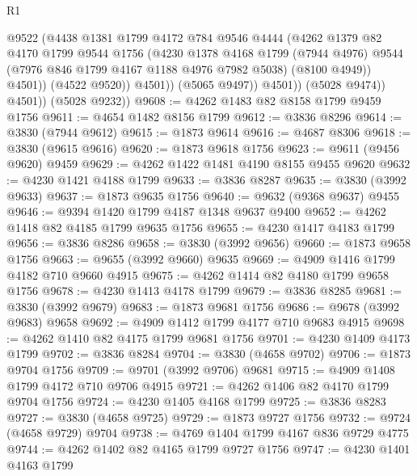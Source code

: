 \begin{lexlean}{R1}
\begin{coremodule}
                        @9522
                        (@4438
                          @1381
                          @1799
                          @4172
                          @784
                          @9546
                          @4444
                          (@4262
                            @1379
                            @82
                            @4170
                            @1799
                            @9544
                            @1756
                            (@4230
                              @1378
                              @4168
                              @1799
                              (@7944 @4976)
                              @9544
                              (@7976 @846 @1799 @4167 @1188 @4976 @7982 @5038)
                              (@8100 @4949))
                            @4501))
                        (@4522 @9520))
                      @4501))
                  (@5065 @9497))
                @4501))
            (@5028 @9474))
          @4501))
      (@5028 @9232))
@9608 := @4262 @1483 @82 @8158 @1799 @9459 @1756
@9611 := @4654 @1482 @8156 @1799
@9612 := @3836 @8296
@9614 := @3830 (@7944 @9612)
@9615 := @1873 @9614
@9616 := @4687 @8306
@9618 := @3830 (@9615 @9616)
@9620 := @1873 @9618 @1756
@9623 := @9611 (@9456 @9620) @9459
@9629 := @4262 @1422 @1481 @4190 @8155 @9455 @9620
@9632 := @4230 @1421 @4188 @1799
@9633 := @3836 @8287
@9635 := @3830 (@3992 @9633)
@9637 := @1873 @9635 @1756
@9640 := @9632 (@9368 @9637) @9455
@9646 := @9394 @1420 @1799 @4187 @1348 @9637 @9400
@9652 := @4262 @1418 @82 @4185 @1799 @9635 @1756
@9655 := @4230 @1417 @4183 @1799
@9656 := @3836 @8286
@9658 := @3830 (@3992 @9656)
@9660 := @1873 @9658 @1756
@9663 := @9655 (@3992 @9660) @9635
@9669 := @4909 @1416 @1799 @4182 @710 @9660 @4915
@9675 := @4262 @1414 @82 @4180 @1799 @9658 @1756
@9678 := @4230 @1413 @4178 @1799
@9679 := @3836 @8285
@9681 := @3830 (@3992 @9679)
@9683 := @1873 @9681 @1756
@9686 := @9678 (@3992 @9683) @9658
@9692 := @4909 @1412 @1799 @4177 @710 @9683 @4915
@9698 := @4262 @1410 @82 @4175 @1799 @9681 @1756
@9701 := @4230 @1409 @4173 @1799
@9702 := @3836 @8284
@9704 := @3830 (@4658 @9702)
@9706 := @1873 @9704 @1756
@9709 := @9701 (@3992 @9706) @9681
@9715 := @4909 @1408 @1799 @4172 @710 @9706 @4915
@9721 := @4262 @1406 @82 @4170 @1799 @9704 @1756
@9724 := @4230 @1405 @4168 @1799
@9725 := @3836 @8283
@9727 := @3830 (@4658 @9725)
@9729 := @1873 @9727 @1756
@9732 := @9724 (@4658 @9729) @9704
@9738 := @4769 @1404 @1799 @4167 @836 @9729 @4775
@9744 := @4262 @1402 @82 @4165 @1799 @9727 @1756
@9747 := @4230 @1401 @4163 @1799

\end{coremodule}
\end{lexlean}
